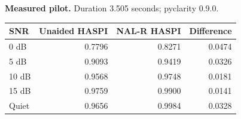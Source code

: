 \textbf{Measured pilot.} Duration 3.505 seconds; pyclarity 0.9.0.\par
\begin{center}\begin{tabular}{lrrr}\toprule
SNR & Unaided HASPI & NAL-R HASPI & Difference\\\midrule
0 dB & 0.7796 & 0.8271 & 0.0474 \\
5 dB & 0.9093 & 0.9419 & 0.0326 \\
10 dB & 0.9568 & 0.9748 & 0.0181 \\
15 dB & 0.9759 & 0.9900 & 0.0141 \\
Quiet & 0.9656 & 0.9984 & 0.0328 \\
\bottomrule\end{tabular}\end{center}

